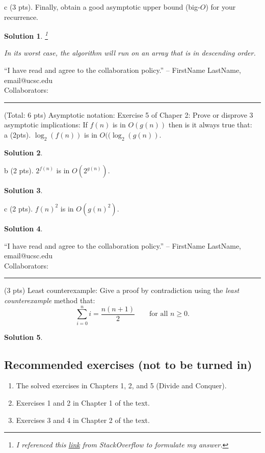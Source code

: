 \documentclass[11pt]{article}
\newtheorem*{solution}{Solution}
\begin{document}
\begin{enumerate}
c (3 pts). Finally, obtain a good asymptotic upper bound (big-$O$) for your recurrence.  
\begin{solution} \footnote{I referenced this \hyperlink{https://stackoverflow.com/questions/30201391/how-to-write-a-recurrence-relation-for-a-given-piece-of-code}{link} from StackOverflow to formulate my answer.}
	\item In its worst case, the algorithm will run on an array that is in descending order.
\end{solution}
\newpage
“I have read and agree to the collaboration policy.” -- FirstName LastName, email@ucsc.edu
\\
Collaborators: %
\\
\hrule
\item (Total: 6 pts) Asymptotic notation:  Exercise 5 of Chaper 2: Prove or disprove 3 asymptotic implications: If $f(n)$ is in $O(g(n))$ then is it always true that: \\
a (2pts). $\log_2 (f(n))$ is in $O(( \log_2 (g(n))$.  
\begin{solution}
\end{solution}
\newpage
b (2 pts). $2^{f(n)}$ is in $O( 2^{g(n)} )$. 
\begin{solution}
\end{solution}
\newpage
c (2 pts). $f(n)^2$ is in $O(g(n)^2)$.
\begin{solution}
\end{solution}
\newpage
“I have read and agree to the collaboration policy.” -- FirstName LastName, email@ucsc.edu
\\
Collaborators: %
\\
\hrule
\item (3 pts) Least counterexample: Give a proof by contradiction using the \emph{least counterexample} method that:
\[
\sum_{i=0}^n i = \frac{n (n+1)}{2}  \qquad \text{for all $n \geq 0$}.
\]
\begin{solution}
\end{solution}
\newpage
\end{enumerate}

\subsection*{Recommended exercises (not to be turned in)}
\begin{enumerate}
\item The solved exercises in Chapters 1, 2, and 5 (Divide and Conquer).
\item Exercises 1 and 2 in Chapter 1 of the text.
\item Exercises 3 and 4 in Chapter 2 of the text.
\end{enumerate} 
\end{document}
